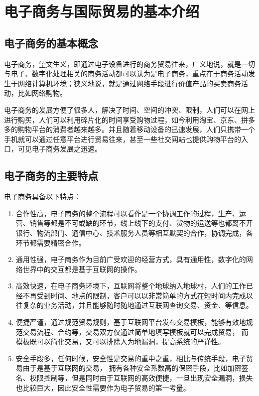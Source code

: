 \chapter{电子商务与国际贸易的基本介绍}
\section{电子商务的基本概念}
电子商务，望文生义，即通过电子设备进行的商务贸易往来，广义地说，就是一切与电子、数字化处理相关的商务活动都可以认为是电子商务，重点在于商务活动发生于网络计算机环境；狭义地说，就是通过网络手段进行价值产品的买卖商务活动，比如网络购物\cite{liuzantong2013}。

电子商务的发展方便了很多人，解决了时间、空间的冲突、限制，人们可以在网上进行购买，人们可以利用碎片化的时间享受购物过程，如今利用淘宝、京东、拼多多的购物平台的消费者越来越多。并且随着移动设备的迅速发展，人们只携带一个手机就可以通过任意平台进行贸易往来，甚至一些社交网站也提供购物平台的入口，可见电子商务发展之迅速\cite{yingxiaofan2014}。

\section{电子商务的主要特点}
电子商务具备以下特点：
\begin{enumerate}[(1)]
\setlength{\itemsep}{0ex}
\item 合作性高，电子商务的整个流程可以看作是一个协调工作的过程，生产、运营、销售等都是不可或缺的环节，线上线下的支付、货物的运送等也都离不开银行、物流部门、通信中心、技术服务人员等相互默契的合作，协调完成，各环节都需要精密合作。
\item 通用性强，电子商务作为目前广受欢迎的经营方式，具有通用性，数字化的网络世界中的交互都是基于互联网的操作。
\item 高效快速，在电子商务环境下，互联网将整个地球纳入地球村，人们的工作已经不再受到时间、地点的限制，客户可以以非常简单的方式在短时间内完成以往复杂的业务活动，并且能够随时随地通过互联网查询交易、资金、等信息。
\item 便捷严谨，通过规范贸易规则，基于互联网平台发布交易模板，能够有效地规范交易流程、合约等，交易双方仅通过简单地填写模板就可以完成贸易，
而模板既可以简化交易，又可以排除人为地漏洞，提高系统的严谨性\cite{zhouxiaoxian2014}。
\item 安全手段多，任何时候，安全性是交易的重中之重，相比与传统手段，电子贸易由于是基于互联网的交易，
拥有各种安全系数高的保密手段，比如加密签名、权限控制等，但是同时由于互联网的高效便捷，一旦出现安全漏洞，损失也比较巨大，因此安全性需要作为电子贸易的第一考量。
\end{enumerate}

